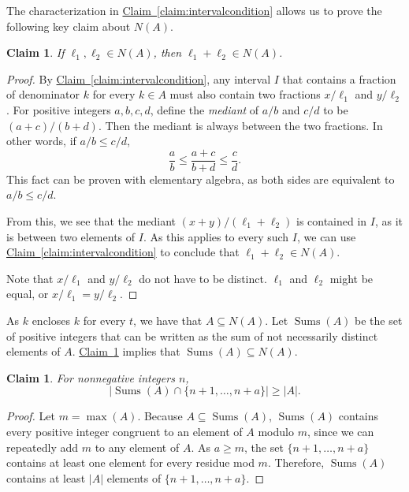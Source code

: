 \documentclass[11pt]{article}
\numberwithin{equation}{section}
\newtheorem{claim}[theorem]{Claim}
\theoremstyle{definition}
\theoremstyle{plain}
\newcommand{\expref}[2]{\hyperref[#2]{#1~\ref{#2}}}
\newcommand{\Nbr}{N}
\newcommand{\A}{A}
\DeclareMathOperator{\Sum}{Sums}
\begin{document}
The characterization in \expref{Claim}{claim:intervalcondition} allows us to prove the following key claim about $\Nbr(\A)$.

\begin{claim}
    \label{claim:sumcondition}
    If $\ell_1,\ell_2\in \Nbr(\A)$, then $\ell_1+\ell_2\in \Nbr(\A)$.
\end{claim}

\begin{proof}
    By \expref{Claim}{claim:intervalcondition}, any interval $I$ that contains a fraction of denominator $k$ for every $k\in \A$ must also contain two fractions $x/\ell_1$ and $y/\ell_2$. For positive integers $a,b,c,d$, define the \emph{mediant} of $a/b$ and $c/d$ to be $(a+c)/(b+d)$. Then the mediant is always between the two fractions. In other words, if $a/b\le c/d$,
    \[\frac{a}{b}\le \frac{a+c}{b+d}\le \frac{c}{d}. \]
    This fact can be proven with elementary algebra, as both sides are equivalent to $a/b\le c/d$.
    
    From this, we see that the mediant $(x+y)/(\ell_1+\ell_2)$ is contained in $I$, as it is between two elements of $I$. As this applies to every such $I$, we can use \expref{Claim}{claim:intervalcondition} to conclude that $\ell_1+\ell_2\in \Nbr(\A)$.
    
    Note that $x/\ell_1$ and $y/\ell_2$ do not have to be distinct. $\ell_1$ and $\ell_2$ might be equal, or $x/\ell_1=y/\ell_2$.
\end{proof}

As $k$ encloses $k$ for every $t$, we have that $\A\subseteq \Nbr(\A)$. Let $\Sum(\A)$ be the set of positive integers that can be written as the sum of not necessarily distinct elements of $\A$. \expref{Claim}{claim:sumcondition} implies that $\Sum(\A)\subseteq \Nbr(\A)$.

\begin{claim}
    For nonnegative integers $n$, \[\lvert\Sum(\A)\cap \{n+1,\dots,n+a\}\rvert\ge |\A|.\]
\end{claim}

\begin{proof}
    Let $m=\max(\A)$. Because $\A\subseteq \Sum(\A)$, $\Sum(\A)$ contains every positive integer congruent to an element of $\A$ modulo $m$, since we can repeatedly add $m$ to any element of $\A$. As $a\ge m$, the set $\{n+1,\dots,n+a\}$ contains at least one element for every residue mod $m$. Therefore, $\Sum(\A)$ contains at least $|\A|$ elements of $\{n+1,\dots,n+a\}$. 
\end{proof}
\end{document}
